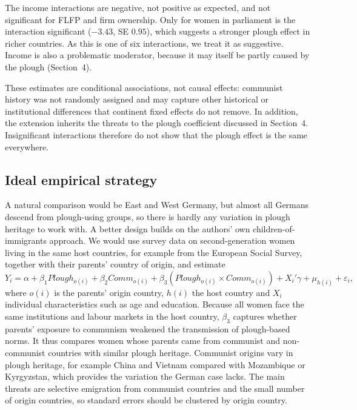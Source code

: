 \documentclass[11pt,a4paper]{article}
\begin{document}
The income interactions are negative, not positive as expected, and not significant for FLFP and firm ownership. Only for women in parliament is the interaction significant ($-3.43$, SE $0.95$), which suggests a stronger plough effect in richer countries. As this is one of six interactions, we treat it as suggestive. Income is also a problematic moderator, because it may itself be partly caused by the plough (Section~4).

These estimates are conditional associations, not causal effects: communist history was not randomly assigned and may capture other historical or institutional differences that continent fixed effects do not remove. In addition, the extension inherits the threats to the plough coefficient discussed in Section~4. Insignificant interactions therefore do not show that the plough effect is the same everywhere.

\subsection{Ideal empirical strategy}

A natural comparison would be East and West Germany, but almost all Germans descend from plough-using groups, so there is hardly any variation in plough heritage to work with. A better design builds on the authors' own children-of-immigrants approach. We would use survey data on second-generation women living in the same host countries, for example from the European Social Survey, together with their parents' country of origin, and estimate
\begin{equation}
    Y_{i} = \alpha + \beta_1 Plough_{o(i)} + \beta_2 Comm_{o(i)} + \beta_3 (Plough_{o(i)} \times Comm_{o(i)}) + X_i'\gamma + \mu_{h(i)} + \varepsilon_{i} ,
    \label{eq:ideal_strategy}
\end{equation}
where $o(i)$ is the parents' origin country, $h(i)$ the host country and $X_i$ individual characteristics such as age and education. Because all women face the same institutions and labour markets in the host country, $\beta_3$ captures whether parents' exposure to communism weakened the transmission of plough-based norms. It thus compares women whose parents came from communist and non-communist countries with similar plough heritage. Communist origins vary in plough heritage, for example China and Vietnam compared with Mozambique or Kyrgyzstan, which provides the variation the German case lacks. The main threats are selective emigration from communist countries and the small number of origin countries, so standard errors should be clustered by origin country.
\end{document}
